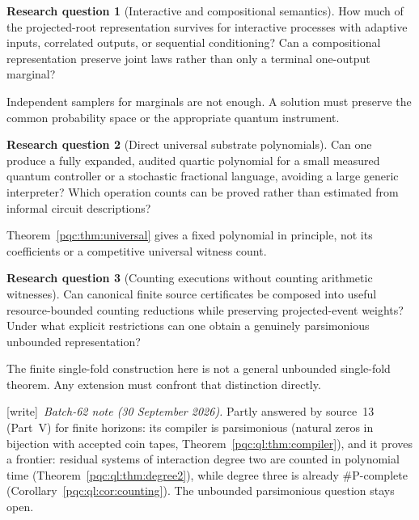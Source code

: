 \documentclass[11pt,letterpaper]{article}
\numberwithin{equation}{section}
\theoremstyle{definition}
\newtheorem{question}{Research question}
\theoremstyle{remark}
\newcommand{\wtag}{\textup{[write]}}
\begin{document}
\begin{question}[Interactive and compositional semantics]
How much of the projected-root representation survives for interactive
processes with adaptive inputs, correlated outputs, or sequential
conditioning? Can a compositional representation preserve joint laws rather
than only a terminal one-output marginal?
\end{question}
Independent samplers for marginals are not enough. A solution must preserve
the common probability space or the appropriate quantum instrument.

\begin{question}[Direct universal substrate polynomials]\label{pqc:q:direct}
Can one produce a fully expanded, audited quartic polynomial for a small
measured quantum controller or a stochastic fractional language, avoiding a
large generic interpreter? Which operation counts can be proved rather than
estimated from informal circuit descriptions?
\end{question}
Theorem~\ref{pqc:thm:universal} gives a fixed polynomial in principle, not its
coefficients or a competitive universal witness count.

\begin{question}[Counting executions without counting arithmetic witnesses]\label{pqc:q:counting}
Can canonical finite source certificates be composed into useful
resource-bounded counting reductions while preserving projected-event
weights? Under what explicit restrictions can one obtain a genuinely
parsimonious unbounded representation?
\end{question}
The finite single-fold construction here is not a general unbounded
single-fold theorem. Any extension must confront that distinction directly.
\par\noindent\wtag\ \emph{Batch-62 note (30 September 2026).} Partly answered by source~13 (Part~V) for finite horizons: its
compiler is parsimonious (natural zeros in bijection with accepted coin tapes,
Theorem~\ref{pqc:ql:thm:compiler}), and it proves a frontier: residual systems of
interaction degree two are counted in polynomial time
(Theorem~\ref{pqc:ql:thm:degree2}), while degree three is already
\#P-complete (Corollary~\ref{pqc:ql:cor:counting}). The unbounded parsimonious
question stays open.
\end{document}

